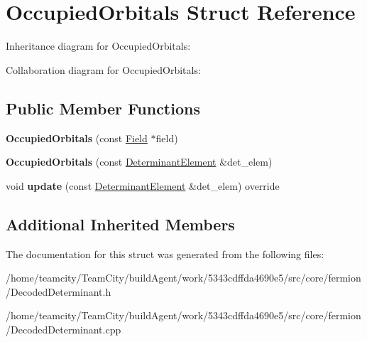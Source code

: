 \hypertarget{structOccupiedOrbitals}{}\section{Occupied\+Orbitals Struct Reference}
\label{structOccupiedOrbitals}


Inheritance diagram for Occupied\+Orbitals\+:


Collaboration diagram for Occupied\+Orbitals\+:
\subsection*{Public Member Functions}
\begin{DoxyCompactItemize}
\item 
{\bfseries Occupied\+Orbitals} (const \hyperlink{classField}{Field} $\ast$field)\hypertarget{structOccupiedOrbitals_a32b0dfc718c1beff3dfde8aafff43ad4}{}\label{structOccupiedOrbitals_a32b0dfc718c1beff3dfde8aafff43ad4}

\item 
{\bfseries Occupied\+Orbitals} (const \hyperlink{classDeterminantElement}{Determinant\+Element} \&det\+\_\+elem)\hypertarget{structOccupiedOrbitals_af7c41020b9a89ed15d37cee234cb4a49}{}\label{structOccupiedOrbitals_af7c41020b9a89ed15d37cee234cb4a49}

\item 
void {\bfseries update} (const \hyperlink{classDeterminantElement}{Determinant\+Element} \&det\+\_\+elem) override\hypertarget{structOccupiedOrbitals_a01a8a2b198323392cf39758d68dbfd6e}{}\label{structOccupiedOrbitals_a01a8a2b198323392cf39758d68dbfd6e}

\end{DoxyCompactItemize}
\subsection*{Additional Inherited Members}


The documentation for this struct was generated from the following files\+:\begin{DoxyCompactItemize}
\item 
/home/teamcity/\+Team\+City/build\+Agent/work/5343cdffda4690e5/src/core/fermion/Decoded\+Determinant.\+h\item 
/home/teamcity/\+Team\+City/build\+Agent/work/5343cdffda4690e5/src/core/fermion/Decoded\+Determinant.\+cpp\end{DoxyCompactItemize}
